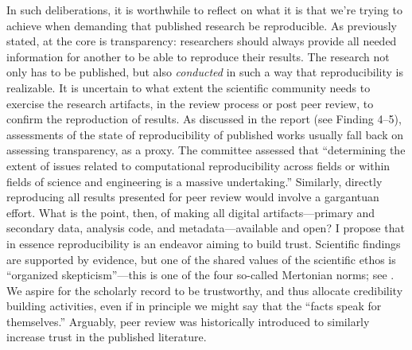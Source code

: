\documentclass{statement}
\newlength{\up}
\begin{document}
In such deliberations, it is worthwhile to reflect on what it is that we're trying to achieve when demanding that published research be reproducible. 
As previously stated, at the core is transparency: researchers should always provide all needed information for another to be able to reproduce their results. 
The research not only has to be published, but also \emph{conducted} in such a way that reproducibility is realizable. 
It is uncertain to what extent the scientific community needs to exercise the research artifacts, in the review process or post peer review, to confirm the reproduction of results. 
As discussed in the \cite{nasem_2019} report (see Finding 4--5), assessments of the state of reproducibility of published works usually fall back on assessing transparency, as a proxy. 
The committee assessed that ``determining the extent of issues related to computational reproducibility across fields or within fields of science and engineering is a massive undertaking.''
Similarly, directly reproducing all results presented for peer review would involve a  gargantuan effort. 
What is the point, then, of making all digital artifacts—primary and secondary data, analysis code, and metadata—available and open? 
I propose that in essence reproducibility is an endeavor aiming to build trust. 
Scientific findings are supported by evidence, but one of the shared values of the scientific ethos is ``organized skepticism''---this is one of the four so-called Mertonian norms; see \cite{christensenETal2019}.
We aspire for the scholarly record to be trustworthy, and thus allocate credibility building activities, even if in principle we might say that the ``facts speak for themselves.'' 
Arguably, peer review was historically introduced to similarly increase trust in the published literature.
\end{document}
